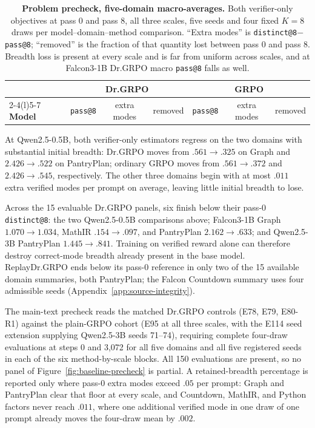 \documentclass{article}
\newcommand{\1}{\mathbf 1}
\theoremstyle{remark}
\theoremstyle{definition}
\theoremstyle{plain}
\begin{document}
\begin{table}[h]
  \centering
  \caption{\textbf{Problem precheck, five-domain macro-averages.} Both
  verifier-only objectives at pass 0 and pass 8, all three scales, five seeds
  and four fixed $K=8$ draws per model--domain--method comparison. ``Extra modes'' is
  \texttt{distinct@8}$-$\texttt{pass@8}; ``removed'' is the fraction of that
  quantity lost between pass 0 and pass 8. Breadth loss is present at every
  scale and is far from uniform across scales, and at Falcon3-1B Dr.GRPO
  macro \texttt{pass@8} falls as well.}
  \label{tab:baseline-collapse-precheck}
  \small
  \setlength{\tabcolsep}{4.5pt}
  \begin{tabular}{@{}l*{6}{c}@{}}
    \toprule
    & \multicolumn{3}{c}{\textbf{Dr.GRPO}} & \multicolumn{3}{c}{\textbf{GRPO}} \\
    \cmidrule(lr){2-4}\cmidrule(l){5-7}
    \textbf{Model} & \texttt{pass@8} & extra modes & removed
                   & \texttt{pass@8} & extra modes & removed \\
    \midrule
    
  \end{tabular}
\end{table}

At Qwen2.5-0.5B, both verifier-only
estimators regress on the two domains with substantial initial breadth:
Dr.GRPO moves from $.561\to.325$ on Graph and $2.426\to.522$ on PantryPlan;
ordinary GRPO moves from $.561\to.372$ and $2.426\to.545$, respectively.
The other three domains begin with at most $.011$ extra verified modes per
prompt on average, leaving little initial breadth to lose.

Across the 15 evaluable Dr.GRPO panels, six finish below their pass-0
\texttt{distinct@8}: the two Qwen2.5-0.5B comparisons above; Falcon3-1B Graph
$1.070\to1.034$, MathIR $.154\to.097$, and PantryPlan $2.162\to.633$; and
Qwen2.5-3B PantryPlan $1.445\to.841$. Training on verified reward alone can
therefore destroy correct-mode breadth already present in the base model.
ReplayDr.GRPO ends below its pass-0 reference in only two of the 15 available
domain summaries, both PantryPlan; the Falcon Countdown summary uses four
admissible seeds (Appendix~\ref{app:source-integrity}).

The main-text precheck reads the matched Dr.GRPO controls (E78, E79,
E80-R1) against the plain-GRPO cohort (E95 at all three scales, with the E114
seed extension supplying Qwen2.5-3B seeds 71--74), requiring complete four-draw
evaluations at steps 0 and 3,072 for all five domains and all five registered
seeds in each of the six method-by-scale blocks. All 150 evaluations are present, so no
panel of Figure~\ref{fig:baseline-precheck} is partial. A retained-breadth
percentage is reported only where pass-0 extra modes exceed $.05$ per prompt:
Graph and PantryPlan clear that floor at every scale, and Countdown, MathIR,
and Python factors never reach $.011$, where one additional verified mode in
one draw of one prompt already moves the four-draw mean by $.002$.
\end{document}
